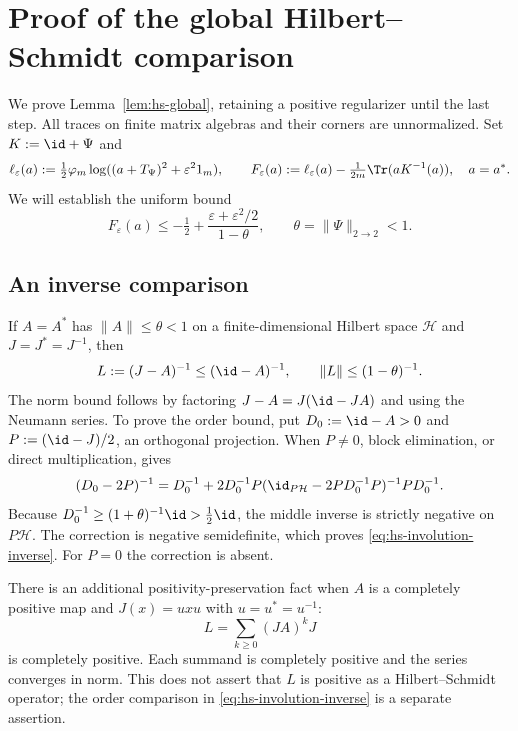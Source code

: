 \section{Proof of the global Hilbert--Schmidt comparison}
\label{app:comparison}

We prove Lemma~\ref{lem:hs-global}, retaining a positive regularizer until the last step.
All traces on finite matrix algebras and their corners are unnormalized.
Set $K:=\id+\Psi$ and
\[
 \ell_\varepsilon(a):=\tfrac12\varphi_m
       \log((a+T_\Psi)^2+\varepsilon^21_m),\qquad
 F_\varepsilon(a):=\ell_\varepsilon(a)
       -\tfrac1{2m}\Tr(aK^{-1}(a)),\quad a=a^*.
\]
We will establish the uniform bound
\begin{equation}\label{eq:hs-regularized-global}
 F_\varepsilon(a)\le-\tfrac12+
              \frac{\varepsilon+\varepsilon^2/2}{1-\theta},
 \qquad \theta=\|\Psi\|_{2\to2}<1.
\end{equation}

\subsection{An inverse comparison}
If $A=A^*$ has $\|A\|\le\theta<1$ on a finite-dimensional Hilbert space $\mathcal H$ and $J=J^*=J^{-1}$, then
\begin{equation}\label{eq:hs-involution-inverse}
 L:=(J-A)^{-1}\le(\id-A)^{-1},\qquad
 \|L\|\le(1-\theta)^{-1}.
\end{equation}
The norm bound follows by factoring $J-A=J(\id-JA)$ and using the Neumann series.
To prove the order bound, put $D_0:=\id-A>0$ and $P:=(\id-J)/2$, an orthogonal projection.
When $P\ne0$, block elimination, or direct multiplication, gives
\[
 (D_0-2P)^{-1}=D_0^{-1}+2D_0^{-1}P
   (\id_{P\mathcal H}-2PD_0^{-1}P)^{-1}PD_0^{-1}.
\]
Because $D_0^{-1}\ge(1+\theta)^{-1}\id>\tfrac12\id$, the middle inverse is strictly negative on $P\mathcal H$.
The correction is negative semidefinite, which proves \eqref{eq:hs-involution-inverse}.
For $P=0$ the correction is absent.

There is an additional positivity-preservation fact when $A$ is a completely positive map and $J(x)=uxu$ with $u=u^*=u^{-1}$:
\begin{equation}\label{eq:hs-inverse-cp}
 L=\sum_{k\ge0}(JA)^kJ
\end{equation}
is completely positive.
Each summand is completely positive and the series converges in norm.
This does not assert that $L$ is positive as a Hilbert--Schmidt operator; the order comparison in \eqref{eq:hs-involution-inverse} is a separate assertion.

